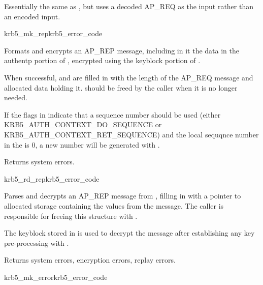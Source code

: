 Essentially the same as , but uses a decoded AP_REQ
as the input rather than an encoded input.

\begin{funcdecl}{krb5_mk_rep}{krb5_error_code}{\funcinout}
\funcout
{}
\end{funcdecl}

Formats and encrypts an AP_REP message, including in it the data in the
authentp portion of , encrypted using the
keyblock portion of . 

When successful,  and
 are filled in with the length of the
AP_REQ message and allocated data holding it.
 should be freed by the
caller when it is no longer needed. 

If the flags in  indicate that a sequence number
should be used (either {\sc KRB5_AUTH_CONTEXT_DO_SEQUENCE} or
{\sc KRB5_AUTH_CONTEXT_RET_SEQUENCE}) and the local sequqnce number in the
 is 0, a new number will be generated with
.

Returns system errors.

\begin{funcdecl}{krb5_rd_rep}{krb5_error_code}{\funcinout}
\funcin
{}
\funcout
{}
\end{funcdecl}

Parses and decrypts an AP_REP message from , filling in
 with a pointer to  allocated storage containing the
values from the message.  The caller is responsible for freeing this
structure with .

The keyblock stored in  is used to decrypt the
message after establishing any key pre-processing with
. 

Returns system errors, encryption errors, replay errors.

\begin{funcdecl}{krb5_mk_error}{krb5_error_code}{\funcinout}
\funcin
{}
\funcout
{}
\end{funcdecl}

